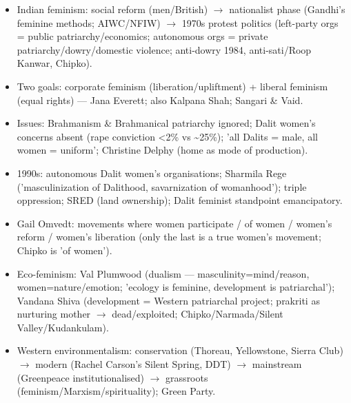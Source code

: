 \begin{QuickRevision}
\begin{itemize}
\item Indian feminism: social reform (men/British) $\rightarrow$ nationalist phase (Gandhi's feminine methods; AIWC/NFIW) $\rightarrow$ 1970s protest politics (left-party orgs = public patriarchy/economics; autonomous orgs = private patriarchy/dowry/domestic violence; anti-dowry 1984, anti-sati/Roop Kanwar, Chipko).
\item Two goals: corporate feminism (liberation/upliftment) + liberal feminism (equal rights) --- Jana Everett; also Kalpana Shah; Sangari \& Vaid.
\item Issues: Brahmanism \& Brahmanical patriarchy ignored; Dalit women's concerns absent (rape conviction <2\% vs \textasciitilde{}25\%); 'all Dalits = male, all women = uniform'; Christine Delphy (home as mode of production).
\item 1990s: autonomous Dalit women's organisations; Sharmila Rege ('masculinization of Dalithood, savarnization of womanhood'); triple oppression; SRED (land ownership); Dalit feminist standpoint emancipatory.
\item Gail Omvedt: movements where women participate / of women / women's reform / women's liberation (only the last is a true women's movement; Chipko is 'of women').
\item Eco-feminism: Val Plumwood (dualism --- masculinity=mind/reason, women=nature/emotion; 'ecology is feminine, development is patriarchal'); Vandana Shiva (development = Western patriarchal project; prakriti as nurturing mother $\rightarrow$ dead/exploited; Chipko/Narmada/Silent Valley/Kudankulam).
\item Western environmentalism: conservation (Thoreau, Yellowstone, Sierra Club) $\rightarrow$ modern (Rachel Carson's Silent Spring, DDT) $\rightarrow$ mainstream (Greenpeace institutionalised) $\rightarrow$ grassroots (feminism/Marxism/spirituality); Green Party.
\end{itemize}
\end{QuickRevision}

